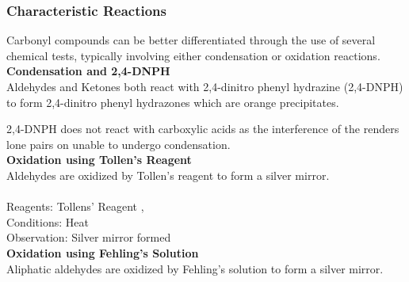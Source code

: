 \documentclass[../main]{subfiles}
\begin{document}
	\subsubsection{Characteristic Reactions}

	Carbonyl compounds can be better differentiated through the use of several chemical tests, typically involving either condensation or oxidation reactions. \\

	\noindent \textbf{Condensation and 2,4-DNPH} \\

	Aldehydes and Ketones both react with 2,4-dinitro phenyl hydrazine (2,4-DNPH) to form 2,4-dinitro phenyl hydrazones which are orange precipitates.


	\vspace{12pt}

	2,4-DNPH does not react with carboxylic acids as the interference of the  renders lone pairs on  unable to undergo condensation. \\

	\noindent \textbf{Oxidation using Tollen's Reagent} \\

	Aldehydes are oxidized by Tollen's reagent to form a silver mirror. \\

	 \\

	Reagents: Tollens' Reagent \ch{[Ag(NH3)2]+},  \\
	Conditions: Heat \\
	Observation: Silver mirror formed \\

	\noindent \textbf{Oxidation using Fehling's Solution} \\

	Aliphatic aldehydes are oxidized by Fehling's solution to form a silver mirror. \\

	 \\
\end{document}
